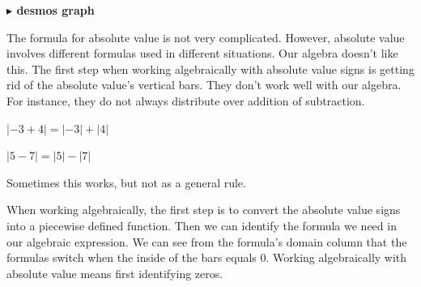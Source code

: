 \documentclass{ximera}
\begin{document}
\begin{example}
\begin{image}
\end{image}







\begin{onlineOnly}
\textbf{\textcolor{blue!55!black}{$\blacktriangleright$ desmos graph}} 
\begin{center}
\end{center}
\end{onlineOnly}





\end{example}

The formula for absolute value is not very complicated.  However, absolute value involves different formulas used in different situations.  Our algebra doesn't like this. The first step when working algebraically with absolute value signs is getting rid of the absolute value's vertical bars.  They don't work well with our algebra. For instance, they do not always distribute over addition of subtraction.


\begin{question} 


$| -3 + 4 | = | -3 | + | 4 |$
  \begin{multipleChoice}
  \end{multipleChoice}
\end{question}


\begin{question} 


$| 5 - 7 | = | 5 | - | 7 |$
  \begin{multipleChoice}
  \end{multipleChoice}
\end{question}


Sometimes this works, but not as a general rule.


When working algebraically, the first step is to convert the absolute value signs into a piecewise defined function. Then we can identify the formula we need in our algebraic expression.  We can see from the formula's domain column that the formulas switch when the inside of the bars equals $0$. Working algebraically with absolute value means first identifying zeros.
\end{document}
